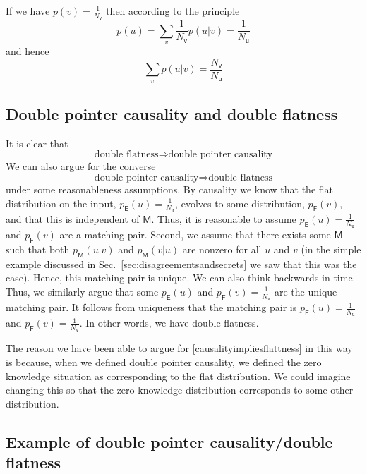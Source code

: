 \documentclass[10pt]{article}
\begin{document}
If we have $p(v)=\frac{1}{N_\mathsf{v}}$ then according to the principle
\begin{equation}
p(u) = \sum_v \frac{1}{N_\mathsf{v}} p(u|v) = \frac{1}{N_\mathsf{u}}
\end{equation}
and hence
\begin{equation}
\sum_v p(u|v) = \frac{N_\mathsf{v}}{N_\mathsf{u}}
\end{equation}


\subsection{Double pointer causality and double flatness}

It is clear that
\begin{equation}\text{double flatness} \Rightarrow \text{double pointer causality} \end{equation}
We can also argue for the converse
\begin{equation}\label{causalityimpliesflattness} \text{double pointer causality} \Rightarrow \text{double flatness} \end{equation}
under some reasonableness assumptions.  By causality we know that the flat distribution on the input, $p_\mathsf{E}(u)=\frac{1}{N_\mathtt{u}}$, evolves to some distribution, $p_\mathsf{F}(v)$, and that this is independent of $\mathsf M$.  Thus, it is reasonable to assume $p_\mathsf{E}(u)=\frac{1}{N_\mathtt{u}}$ and $p_\mathsf{F}(v)$ are a matching pair.  Second, we assume that there exists some $\mathsf{M}$ such that both $p_\mathsf{M}(u|v)$ and $p_\mathsf{M}(v|u)$ are nonzero for all $u$ and $v$ (in the simple example discussed in Sec.\ \ref{sec:disagreementsandsecrets} we saw that this was the case).  Hence, this matching pair is unique.  We can also think backwards in time.  Thus, we similarly argue that some $p_\mathsf{E}(u)$ and $p_\mathsf{F}(v)=\frac{1}{N_\mathtt{v}}$ are the unique matching pair.  It follows from uniqueness that the matching pair is $p_\mathsf{E}(u)=\frac{1}{N_\mathtt{u}}$ and $p_\mathsf{F}(v)=\frac{1}{N_\mathtt{v}}$.  In other words, we have double flatness.


The reason we have been able to argue for  \eqref{causalityimpliesflattness} in this way is because, when we defined double pointer causality, we defined the zero knowledge situation as corresponding to the flat distribution.  We could imagine changing this so that the zero knowledge distribution corresponds to some other distribution.


\subsection{Example of double pointer causality/double flatness}
\end{document}
